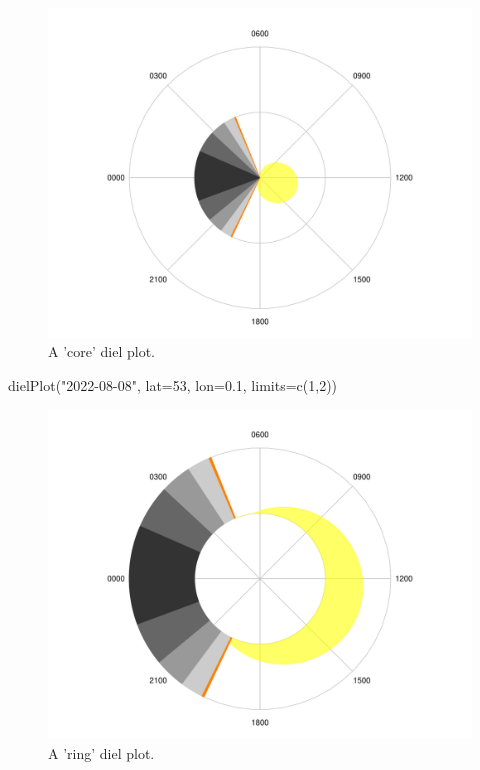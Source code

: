 \documentclass[
]{book}
\newenvironment{Shaded}{\begin{snugshade}}{\end{snugshade}}
\newcommand{\AttributeTok}[1]{\textcolor[rgb]{0.77,0.63,0.00}{#1}}
\newcommand{\DecValTok}[1]{\textcolor[rgb]{0.00,0.00,0.81}{#1}}
\newcommand{\FloatTok}[1]{\textcolor[rgb]{0.00,0.00,0.81}{#1}}
\newcommand{\FunctionTok}[1]{\textcolor[rgb]{0.00,0.00,0.00}{#1}}
\newcommand{\NormalTok}[1]{#1}
\newcommand{\StringTok}[1]{\textcolor[rgb]{0.31,0.60,0.02}{#1}}
\begin{document}
\begin{figure}

{\centering \includegraphics[width=0.9\linewidth]{_main_files/figure-latex/diel-plot-core-1} 

}

\caption{A 'core' diel plot.}\label{fig:diel-plot-core}
\end{figure}

\begin{Shaded}
\begin{Highlighting}[]
\FunctionTok{dielPlot}\NormalTok{(}\StringTok{"2022{-}08{-}08"}\NormalTok{, }\AttributeTok{lat=}\DecValTok{53}\NormalTok{, }\AttributeTok{lon=}\FloatTok{0.1}\NormalTok{, }\AttributeTok{limits=}\FunctionTok{c}\NormalTok{(}\DecValTok{1}\NormalTok{,}\DecValTok{2}\NormalTok{))}
\end{Highlighting}
\end{Shaded}

\begin{figure}

{\centering \includegraphics[width=0.9\linewidth]{_main_files/figure-latex/diel-plot-ring-1} 

}

\caption{A 'ring' diel plot.}\label{fig:diel-plot-ring}
\end{figure}
\end{document}
